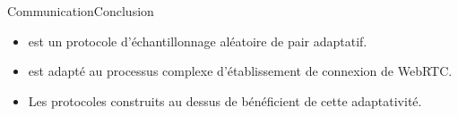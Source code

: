 \begin{frame}{Communication}{Conclusion}
  
  \begin{itemize}
  \item \SPRAY est un protocole d'échantillonnage aléatoire de pair adaptatif.
  \item \SPRAY est adapté au processus complexe d'établissement de connexion de
    WebRTC.
  \end{itemize}

  \vspace{1cm}

  \begin{itemize}
  \item Les protocoles construits au dessus de \SPRAY bénéficient de cette
    adaptativité.
  \end{itemize}

\end{frame}

